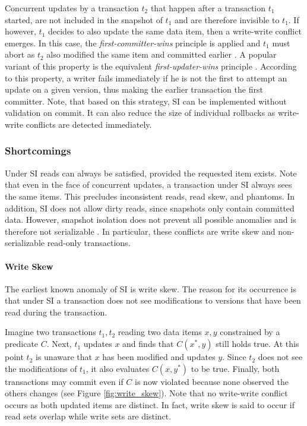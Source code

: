 Concurrent updates by a transaction $t_2$ that happen after a transaction $t_1$
started, are not included in the snapshot of $t_1$ and are therefore invisible
to $t_1$. If however, $t_1$ decides to also update the same data item, then a
write-write conflict emerges. In this case, the \emph{first-committer-wins}
principle is applied and $t_1$ must abort as $t_2$ also modified the same item
and committed earlier \cite{berenson1995critique}. A popular variant of this
property is the equivalent \emph{first-updater-wins} principle
\cite{fekete2004read, larson2011high}. According to this property, a writer
fails immediately if he is not the first to attempt an update on a given
version, thus making the earlier transaction the first committer. Note, that
based on this strategy, SI can be implemented without validation on commit. It
can also reduce the size of individual rollbacks as write-write conflicts are
detected immediately.

\subsubsection{Shortcomings}

Under SI reads can always be satisfied, provided the requested item exists. Note
that even in the face of concurrent updates, a transaction under SI always sees
the same items. This precludes inconsistent reads, read skew, and phantoms. In
addition, SI does not allow dirty reads, since snapshots only contain committed
data. However, snapshot isolation does not prevent all possible anomalies and is
therefore not serializable \cite{berenson1995critique, fekete2004read}. In
particular, these conflicts are write skew and non-serializable read-only
transactions.

\paragraph{Write Skew}

The earliest known anomaly of SI is write skew. The reason for its occurrence is
that under SI a transaction does not see modifications to versions that have
been read during the transaction.

Imagine two transactions $t_1, t_2$ reading two data items $x, y$ constrained by
a predicate $C$. Next, $t_1$ updates $x$ and finds that $C(x^{*}, y)$ still
holds true. At this point $t_2$ is unaware that $x$ has been modified and
updates $y$. Since $t_2$ does not see the modifications of $t_1$, it also
evaluates $C(x, y^{*})$ to be true. Finally, both transactions may commit even
if $C$ is now violated because none observed the others changes (see Figure
\ref{fig:write_skew}). Note that no write-write conflict occurs as both updated
items are distinct. In fact, write skew is said to occur if read sets overlap
while write sets are distinct.

